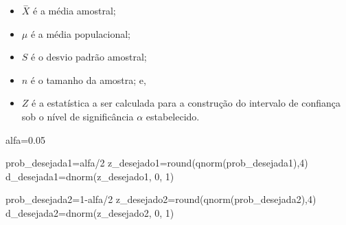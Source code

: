 \documentclass[
]{book}
\newenvironment{Shaded}{\begin{snugshade}}{\end{snugshade}}
\newcommand{\DecValTok}[1]{\textcolor[rgb]{0.00,0.00,0.81}{#1}}
\newcommand{\FloatTok}[1]{\textcolor[rgb]{0.00,0.00,0.81}{#1}}
\newcommand{\FunctionTok}[1]{\textcolor[rgb]{0.00,0.00,0.00}{#1}}
\newcommand{\NormalTok}[1]{#1}
\newcommand{\OtherTok}[1]{\textcolor[rgb]{0.56,0.35,0.01}{#1}}
\newcommand{\SpecialCharTok}[1]{\textcolor[rgb]{0.00,0.00,0.00}{#1}}
\providecommand{\tightlist}{%
  \setlength{\itemsep}{0pt}\setlength{\parskip}{0pt}}
\begin{document}
\begin{itemize}
\tightlist
\item
  \(\stackrel{-}{X}\) é a média amostral;\\
\item
  \(\mu\) é a média populacional;\\
\item
  \(S\) é o desvio padrão amostral;
\item
  \(n\) é o tamanho da amostra; e,
\item
  \(Z\) é a estatística a ser calculada para a construção do intervalo de confiança sob o nível de significância \(\alpha\) estabelecido.
\end{itemize}

\hfill\break

\begin{Shaded}
\begin{Highlighting}[]
\NormalTok{alfa}\OtherTok{=}\FloatTok{0.05}

\NormalTok{prob\_desejada1}\OtherTok{=}\NormalTok{alfa}\SpecialCharTok{/}\DecValTok{2}
\NormalTok{z\_desejado1}\OtherTok{=}\FunctionTok{round}\NormalTok{(}\FunctionTok{qnorm}\NormalTok{(prob\_desejada1),}\DecValTok{4}\NormalTok{)}
\NormalTok{d\_desejada1}\OtherTok{=}\FunctionTok{dnorm}\NormalTok{(z\_desejado1, }\DecValTok{0}\NormalTok{, }\DecValTok{1}\NormalTok{)}

\NormalTok{prob\_desejada2}\OtherTok{=}\DecValTok{1}\SpecialCharTok{{-}}\NormalTok{alfa}\SpecialCharTok{/}\DecValTok{2}
\NormalTok{z\_desejado2}\OtherTok{=}\FunctionTok{round}\NormalTok{(}\FunctionTok{qnorm}\NormalTok{(prob\_desejada2),}\DecValTok{4}\NormalTok{)}
\NormalTok{d\_desejada2}\OtherTok{=}\FunctionTok{dnorm}\NormalTok{(z\_desejado2, }\DecValTok{0}\NormalTok{, }\DecValTok{1}\NormalTok{)}





\end{Highlighting}
\end{Shaded}
\end{document}
